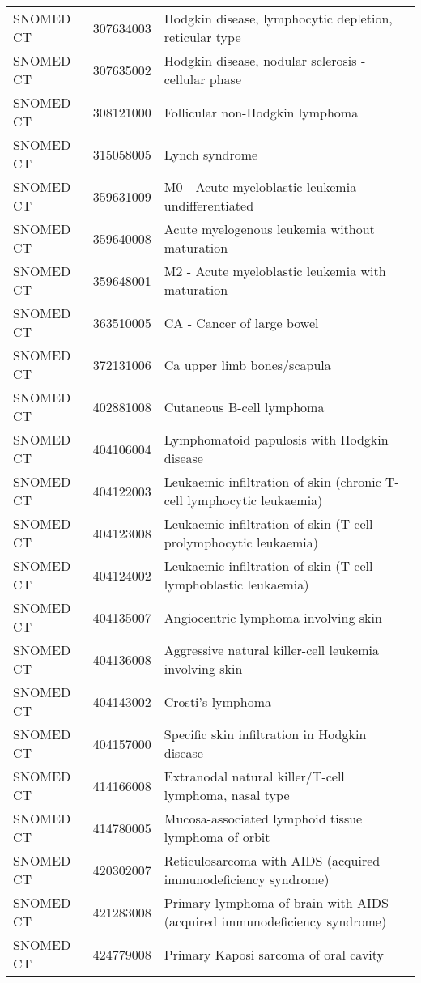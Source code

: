 \begin{longtable}{p{}p{}p{}}
  SNOMED CT & 307634003 & Hodgkin disease, lymphocytic depletion, reticular type \\ 
  SNOMED CT & 307635002 & Hodgkin disease, nodular sclerosis - cellular phase \\ 
  SNOMED CT & 308121000 & Follicular non-Hodgkin lymphoma \\ 
  SNOMED CT & 315058005 & Lynch syndrome \\ 
  SNOMED CT & 359631009 & M0 - Acute myeloblastic leukemia - undifferentiated \\ 
  SNOMED CT & 359640008 & Acute myelogenous leukemia without maturation \\ 
  SNOMED CT & 359648001 & M2 - Acute myeloblastic leukemia with maturation \\ 
  SNOMED CT & 363510005 & CA - Cancer of large bowel \\ 
  SNOMED CT & 372131006 & Ca upper limb bones/scapula \\ 
  SNOMED CT & 402881008 & Cutaneous B-cell lymphoma \\ 
  SNOMED CT & 404106004 & Lymphomatoid papulosis with Hodgkin disease \\ 
  SNOMED CT & 404122003 & Leukaemic infiltration of skin (chronic T-cell lymphocytic leukaemia) \\ 
  SNOMED CT & 404123008 & Leukaemic infiltration of skin (T-cell prolymphocytic leukaemia) \\ 
  SNOMED CT & 404124002 & Leukaemic infiltration of skin (T-cell lymphoblastic leukaemia) \\ 
  SNOMED CT & 404135007 & Angiocentric lymphoma involving skin \\ 
  SNOMED CT & 404136008 & Aggressive natural killer-cell leukemia involving skin \\ 
  SNOMED CT & 404143002 & Crosti's lymphoma \\ 
  SNOMED CT & 404157000 & Specific skin infiltration in Hodgkin disease \\ 
  SNOMED CT & 414166008 & Extranodal natural killer/T-cell lymphoma, nasal type \\ 
  SNOMED CT & 414780005 & Mucosa-associated lymphoid tissue lymphoma of orbit \\ 
  SNOMED CT & 420302007 & Reticulosarcoma with AIDS (acquired immunodeficiency syndrome) \\ 
  SNOMED CT & 421283008 & Primary lymphoma of brain with AIDS (acquired immunodeficiency syndrome) \\ 
  SNOMED CT & 424779008 & Primary Kaposi sarcoma of oral cavity \\ 

\end{longtable}
